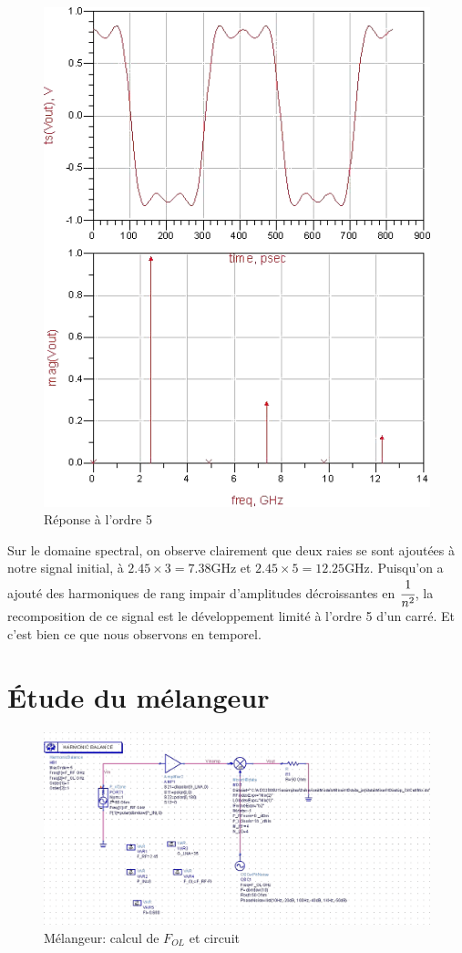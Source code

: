 \documentclass[10pt]{article}
\begin{document}
\begin{figure}
    \begin{center}
        \includegraphics{p6_simu_5}
    \end{center}
    \caption{Réponse à l’ordre 5}
\end{figure}

Sur le domaine spectral, on observe clairement que deux raies se sont ajoutées à notre signal initial, à
$2.45\times 3=7.38$GHz et $2.45\times 5=12.25$GHz. Puisqu’on a ajouté des harmoniques de rang impair d’amplitudes décroissantes en $\cfrac{1}{n^2}$, la recomposition de ce signal est le développement limité à l’ordre 5 d’un carré. Et c’est bien ce que nous observons en temporel.

\section{Étude du mélangeur}

\begin{figure}
    \begin{center}
        \includegraphics[width=15cm]{p8_circuit}
    \end{center}
    \caption{Mélangeur: calcul de $F_{OL}$ et circuit}
\end{figure}
\end{document}
